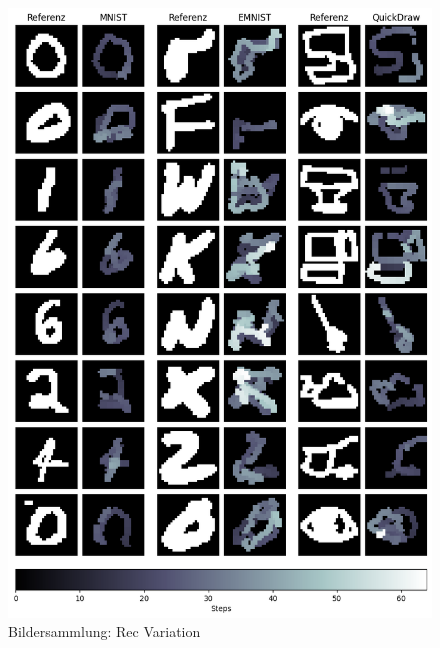 \begin{figure}[!ht]
    \centering
    \includegraphics[width=\textwidth]{images/resultate/rec.png}
    \caption{Bildersammlung: Rec Variation}\label{fig:r-rec}
\end{figure}

